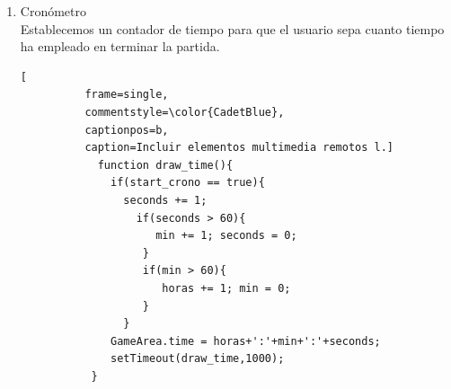 \begin{enumerate}
\item Cronómetro \\ Establecemos un contador de tiempo para que el usuario sepa cuanto tiempo ha empleado
en terminar la partida.
\lstset{language=, breaklines=true, basicstyle=\footnotesize}
          \lstset{numbers=left, numberstyle=\tiny, stepnumber=1, numbersep=-2pt}
          \begin{lstlisting}[
          frame=single,
          commentstyle=\color{CadetBlue},
          captionpos=b,
          caption=Incluir elementos multimedia remotos l.]
            function draw_time(){ 
              if(start_crono == true){ 
                seconds += 1; 
                  if(seconds > 60){ 
                     min += 1; seconds = 0; 
                   } 
                   if(min > 60){ 
                      horas += 1; min = 0; 
                   } 
                } 
              GameArea.time = horas+':'+min+':'+seconds; 
              setTimeout(draw_time,1000);
           }
          \end{lstlisting}

\end{enumerate}

